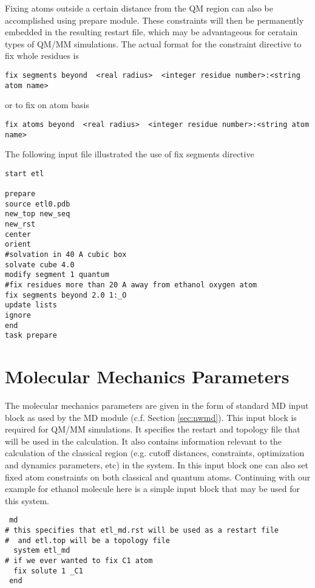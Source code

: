 Fixing atoms outside a certain distance
from the QM region can also be accomplished using prepare module. These 
constraints will then be permanently 
embedded in the resulting restart file, which may be advantageous for ceratain
types of QM/MM simulations. The actual format for the constraint directive to fix whole residues
is 

\begin{verbatim}
fix segments beyond  <real radius>  <integer residue number>:<string atom name>
\end{verbatim}
or to fix on atom basis
\begin{verbatim}
fix atoms beyond  <real radius>  <integer residue number>:<string atom name>
\end{verbatim}

The following input file illustrated the use of fix segments directive

\begin{verbatim}
start etl

prepare
source etl0.pdb
new_top new_seq
new_rst
center
orient
#solvation in 40 A cubic box
solvate cube 4.0
modify segment 1 quantum
#fix residues more than 20 A away from ethanol oxygen atom
fix segments beyond 2.0 1:_O
update lists
ignore
end
task prepare

\end{verbatim}

\section{Molecular Mechanics Parameters}
The molecular mechanics parameters are given in the form of standard MD input block as
used by the MD module (c.f. Section \ref{sec:nwmd}). This input block
is required for QM/MM simulations. It specifies the 
restart and topology file that will be used in the calculation.
It also contains information relevant to the calculation 
of the  classical region 
(e.g. cutoff distances, constraints, optimization and dynamics parameters, etc)
in the system. In this input block one can also set fixed atom constraints on both classical and quantum atoms. Continuing with our
example for ethanol molecule here is a simple input block that may be used for this system.

\begin{verbatim}
 md
# this specifies that etl_md.rst will be used as a restart file
#  and etl.top will be a topology file
  system etl_md
# if we ever wanted to fix C1 atom 
  fix solute 1 _C1
 end
\end{verbatim}


